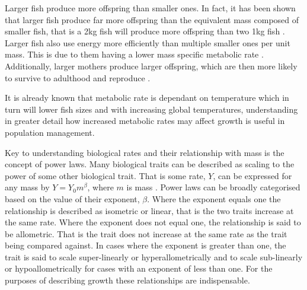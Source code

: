\documentclass[a4paper, 11pt, hidelinks]{article} %
\begin{document}
	Larger fish produce more offspring than smaller ones.  %
	In fact, it has been shown that larger fish produce far more offspring than the equivalent mass composed of smaller fish,  that is a 2kg fish will produce more offspring than two 1kg fish \parencite{Barneche2018}.
	Larger fish also use energy more efficiently than multiple smaller ones per unit mass.  This is due to them having a lower mass specific metabolic rate \parencite{Peters1983, Kleiber1932, Brown2004}.  
	Additionally, larger mothers produce larger offspring, which are then more likely to survive to adulthood and reproduce \parencite{Hixon2014, Marshall2006}. %
	
	It is already known that metabolic rate is dependant on temperature which in turn will lower fish sizes \parencite{Gillooly2001, Brown2004} and with increasing global temperatures, understanding in greater detail how increased metabolic rates may affect growth is useful in population management.
	
	
	Key to understanding biological rates and their relationship with mass is the concept of power laws. Many biological traits can be described as scaling to the power of some other biological trait.  That is some rate, $Y$, can be expressed for any mass by $Y = Y_0 m^\beta$, where $m$ is mass \parencite{Kleiber1932}.  Power laws can be broadly categorised based on the value of their exponent, $\beta$.  
	Where the exponent equals one the relationship is described as isometric or linear, that is the two traits increase at the same rate.  
	Where the exponent does not equal one, the relationship is said to be allometric.  That is the trait does not increase at the same rate as the trait being compared against.  In cases where the exponent is greater than one, the trait is said to scale super-linearly or hyperallometrically and to scale sub-linearly or hypoallometrically for cases with an exponent of less than one.
	For the purposes of describing growth these relationships are indispensable.   
	
\end{document}
